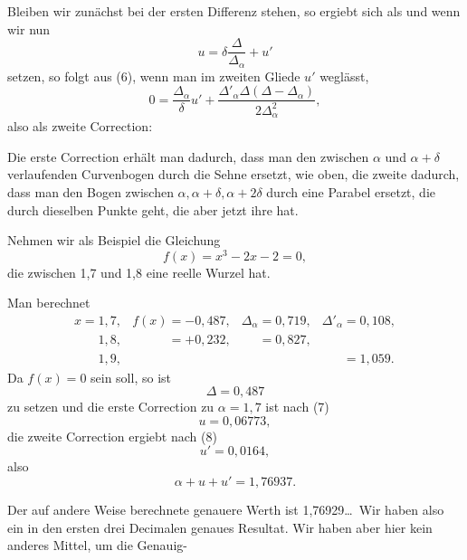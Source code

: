Bleiben wir zunächst bei der ersten Differenz stehen, so ergiebt sich
als 
und wenn wir nun
\[ u = \delta\frac{\varDelta}{\varDelta_\alpha} + u' \]
setzen, so folgt aus (6), wenn man im zweiten Gliede $u'$ weglässt,
\[ 0 = \frac{\varDelta_\alpha}{\delta}u' +
  \frac{\varDelta'_\alpha \varDelta(\varDelta-\varDelta_\alpha)}{2\varDelta_\alpha^2}, \]
also als zweite Correction:

Die erste Correction erhält man dadurch, dass man den zwischen $\alpha$
und $\alpha+\delta$ verlaufenden Curvenbogen durch die Sehne ersetzt,
wie oben, die zweite dadurch, dass man den Bogen zwischen $\alpha,
\alpha+\delta, \alpha+2\delta$ durch eine Parabel ersetzt, die durch
dieselben Punkte geht, die aber jetzt ihre 
hat.

Nehmen wir als Beispiel die Gleichung
\[ f(x) = x^3 - 2x - 2 = 0, \]
die zwischen 1,7 und 1,8 eine reelle Wurzel hat.

Man berechnet
\[
\begin{array}{llll}
x = 1,7, & f(x) = -0,487, & \varDelta_\alpha = 0,719, & \varDelta'_\alpha = 0,108,\\
\phantom{x = {}}1,8, & \phantom{f(x) {}}{=} +0,232, & \phantom{\varDelta_\alpha {}}{=} 0,827, & \\
\phantom{x = {}}1,9, & & & \phantom{\varDelta'_\alpha {}}{=} 1,059.
\end{array}
\]
Da $f(x) = 0$ sein soll, so ist
\[ \varDelta = 0,487 \]
zu setzen und die erste Correction zu $\alpha = 1,7$ ist nach (7)
\[ u = 0,06773, \]
die zweite Correction ergiebt nach (8)
\[ u' = 0,0164, \]
also
\[ \alpha + u + u' = 1,76937. \]

Der auf andere Weise berechnete genauere Werth ist 1,76929\ldots\ Wir
haben also ein in den ersten drei Decimalen genaues Resultat. Wir haben
aber hier kein anderes Mittel, um die Genauig-
